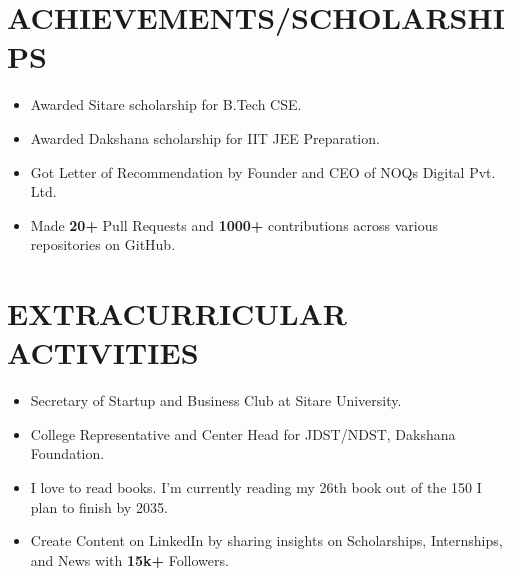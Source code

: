 \documentclass[a4paper,10pt]{article}
\begin{document}
\section*{ACHIEVEMENTS/SCHOLARSHIPS}
\begin{itemize}[leftmargin=4em]
\item Awarded Sitare scholarship for B.Tech CSE.
\item Awarded Dakshana scholarship for IIT JEE Preparation.
\item Got Letter of Recommendation by Founder and CEO of NOQs Digital Pvt. Ltd.
\item Made \textbf{20+} Pull Requests and \textbf{1000+} contributions across various repositories on GitHub.
\end{itemize}


\section*{EXTRACURRICULAR ACTIVITIES}
\begin{itemize}[leftmargin=4em]
\item Secretary of Startup and Business Club at Sitare University.
\item College Representative and Center Head for JDST/NDST, Dakshana Foundation.
\item I love to read books. I’m currently reading my 26th book out of the 150 I plan to finish by 2035.
\item Create Content on LinkedIn by sharing insights on Scholarships, Internships, and News with \textbf{15k+} Followers.
\end{itemize}
\end{document}
